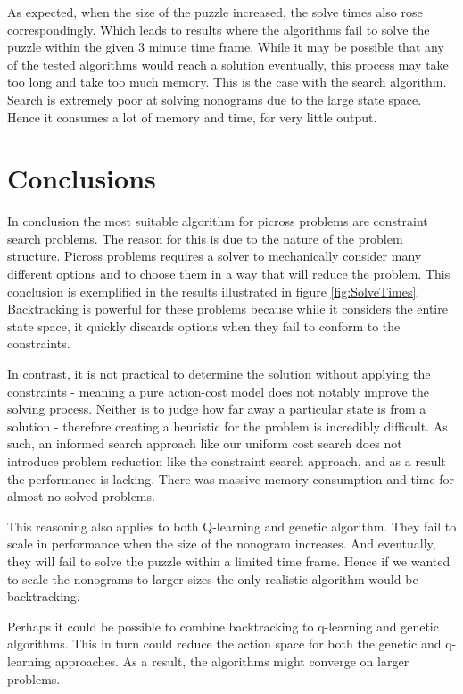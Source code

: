 \documentclass{svproc}
\begin{document}
As expected, when the size of the puzzle increased, the solve times also rose correspondingly.
Which leads to results where the algorithms fail to solve the puzzle within the given 3 minute time frame.
While it may be possible that any of the tested algorithms would reach a solution eventually, this process may take too long and take too much memory.
This is the case with the search algorithm.
Search is extremely poor at solving nonograms due to the large state space.
Hence it consumes a lot of memory and time, for very little output.

\section{Conclusions}
In conclusion the most suitable algorithm for picross problems are constraint search problems.
The reason for this is due to the nature of the problem structure. Picross problems requires a solver to mechanically consider many different options and to choose them in a way that will reduce the problem.
This conclusion is exemplified in the results illustrated in figure \ref{fig:SolveTimes}.
Backtracking is powerful for these problems because while it considers the entire state space, it quickly discards options when they fail to conform to the constraints.

In contrast, it is not practical to determine the solution without applying the constraints - meaning a pure action-cost model does not notably improve the solving process. Neither is to judge how far away a particular state is from a solution - therefore creating a heuristic for the problem is incredibly difficult. As such, an informed search approach like our uniform cost search does not introduce problem reduction like the constraint search approach, and as a result the performance is lacking. There was massive memory consumption and time for almost no solved problems.

This reasoning also applies to both Q-learning and genetic algorithm. They fail to scale in performance when the size of the nonogram increases. And eventually, they will fail to solve the puzzle within a limited time frame. Hence if we wanted to scale the nonograms to larger sizes the only realistic algorithm would be backtracking.

Perhaps it could be possible to combine backtracking to q-learning and genetic algorithms. This in turn could reduce the action space for both the genetic and q-learning approaches. As a result, the algorithms might converge on larger problems.
\end{document}
